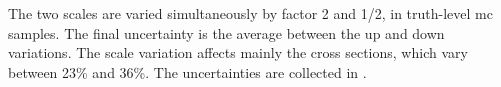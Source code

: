 The two scales are varied simultaneously by factor 2 and 1/2, in truth-level
\gls{mc} samples. The final uncertainty is the average between the up and down
variations. The scale variation affects mainly the cross sections, which vary
between 23\% and 36\%. The uncertainties are collected in .
